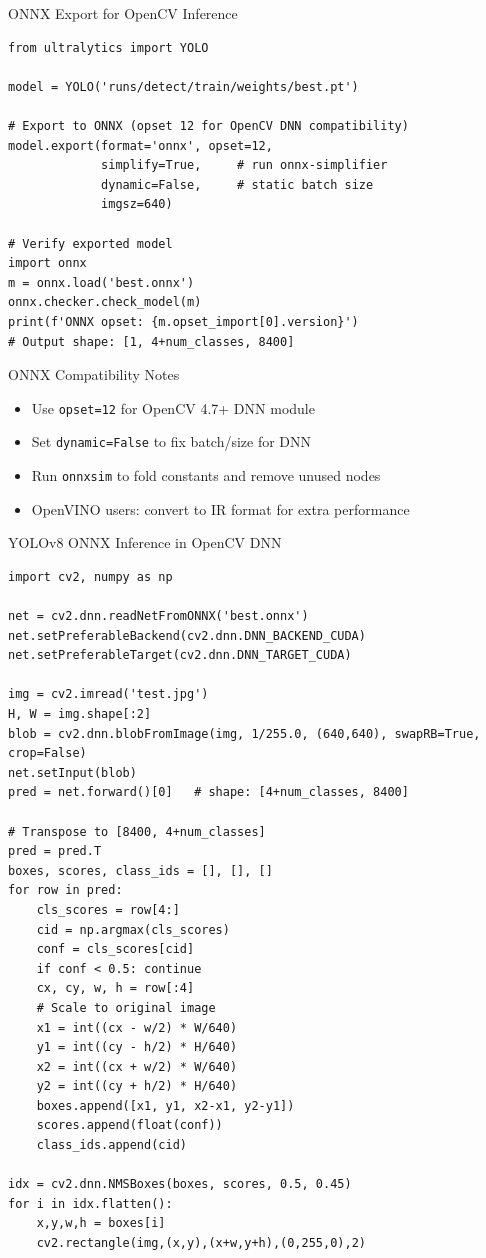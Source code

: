 \documentclass[aspectratio=169]{beamer}
\begin{document}
\begin{frame}[fragile]{ONNX Export for OpenCV Inference}
  \begin{lstlisting}
from ultralytics import YOLO

model = YOLO('runs/detect/train/weights/best.pt')

# Export to ONNX (opset 12 for OpenCV DNN compatibility)
model.export(format='onnx', opset=12,
             simplify=True,     # run onnx-simplifier
             dynamic=False,     # static batch size
             imgsz=640)

# Verify exported model
import onnx
m = onnx.load('best.onnx')
onnx.checker.check_model(m)
print(f'ONNX opset: {m.opset_import[0].version}')
# Output shape: [1, 4+num_classes, 8400]
  \end{lstlisting}
  \begin{block}{ONNX Compatibility Notes}
    \begin{itemize}
      \item Use \texttt{opset=12} for OpenCV 4.7+ DNN module
      \item Set \texttt{dynamic=False} to fix batch/size for DNN
      \item Run \texttt{onnxsim} to fold constants and remove unused nodes
      \item OpenVINO users: convert to IR format for extra performance
    \end{itemize}
  \end{block}
\end{frame}

\begin{frame}[fragile]{YOLOv8 ONNX Inference in OpenCV DNN}
\begin{lstlisting}
import cv2, numpy as np

net = cv2.dnn.readNetFromONNX('best.onnx')
net.setPreferableBackend(cv2.dnn.DNN_BACKEND_CUDA)
net.setPreferableTarget(cv2.dnn.DNN_TARGET_CUDA)

img = cv2.imread('test.jpg')
H, W = img.shape[:2]
blob = cv2.dnn.blobFromImage(img, 1/255.0, (640,640), swapRB=True, crop=False)
net.setInput(blob)
pred = net.forward()[0]   # shape: [4+num_classes, 8400]

# Transpose to [8400, 4+num_classes]
pred = pred.T
boxes, scores, class_ids = [], [], []
for row in pred:
    cls_scores = row[4:]
    cid = np.argmax(cls_scores)
    conf = cls_scores[cid]
    if conf < 0.5: continue
    cx, cy, w, h = row[:4]
    # Scale to original image
    x1 = int((cx - w/2) * W/640)
    y1 = int((cy - h/2) * H/640)
    x2 = int((cx + w/2) * W/640)
    y2 = int((cy + h/2) * H/640)
    boxes.append([x1, y1, x2-x1, y2-y1])
    scores.append(float(conf))
    class_ids.append(cid)

idx = cv2.dnn.NMSBoxes(boxes, scores, 0.5, 0.45)
for i in idx.flatten():
    x,y,w,h = boxes[i]
    cv2.rectangle(img,(x,y),(x+w,y+h),(0,255,0),2)
\end{lstlisting}
\end{frame}
\end{document}
